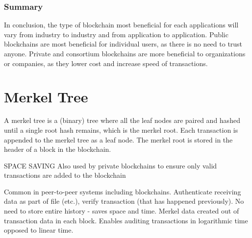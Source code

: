


\subsubsection*{Summary}
In conclusion, the type of blockchain most beneficial for each applications will vary from industry to industry and from application to application. Public blockchains are most beneficial for individual users, as there is no need to trust anyone. Private and consortium blockchains are more beneficial to organizations or companies, as they lower cost and increase speed of transactions.


\section{Merkel Tree}
A merkel tree is a (binary) tree where all the leaf nodes are paired and hashed until a single root hash remains, which is the merkel root. Each transaction is appended to the merkel tree as a leaf node. The merkel root is stored in the header of a block in the blockchain.   

SPACE SAVING
Also used by private blockchains to ensure only valid transactions are added to the blockchain

Common in peer-to-peer systems including blockchains. Authenticate receiving data as part of file (etc.), verify transaction (that has happened previously). No need to store entire history - saves space and time. Merkel data created out of transaction data in each block. Enables auditing transactions in logarithmic time opposed to linear time.   


